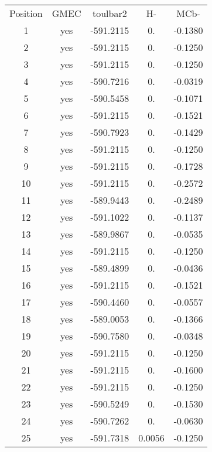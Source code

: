     \begin{table}[h]
      \centering
      
      \begin{tabular}{ccccc}
        
        \toprule
        Position & GMEC & toulbar2 & H- & MCb- \\
        \cmidrule{1-3}
        1  & yes &  -591.2115 & 0. &  -0.1380 \\
        2  & yes &  -591.2115 & 0. &  -0.1250 \\
        3  & yes &  -591.2115 & 0. &  -0.1250 \\
        4  & yes &  -590.7216 & 0. &  -0.0319 \\
        5  & yes &  -590.5458 & 0. &  -0.1071 \\
        6  & yes &  -591.2115 & 0. &  -0.1521 \\
        7  & yes &  -590.7923 & 0. &  -0.1429 \\
        8  & yes &  -591.2115 & 0. &  -0.1250 \\
        9  & yes &  -591.2115 & 0. &  -0.1728 \\
        10 & yes &  -591.2115 & 0. &  -0.2572 \\
        11 & yes &  -589.9443 & 0. &  -0.2489 \\
        12 & yes &  -591.1022 & 0. &  -0.1137 \\
        13 & yes &  -589.9867 & 0. &  -0.0535 \\
        14 & yes &  -591.2115 & 0. &  -0.1250 \\
        15 & yes &  -589.4899 & 0. &  -0.0436 \\
        16 & yes &  -591.2115 & 0. &  -0.1521 \\
        17 & yes &  -590.4460 & 0. &  -0.0557 \\
        18 & yes &  -589.0053 & 0. &  -0.1366 \\
        19 & yes &  -590.7580 & 0. &  -0.0348 \\
        20 & yes &  -591.2115 & 0. &  -0.1250 \\
        21 & yes &  -591.2115 & 0. &  -0.1600 \\
        22 & yes &  -591.2115 & 0. &  -0.1250 \\
        23 & yes &  -590.5249 & 0. &  -0.1530 \\
        24 & yes &  -590.7262 & 0. &  -0.0630 \\
        25 & yes &  -591.7318 & 0.0056 &  -0.1250 \\

\end{tabular}
\end{table}
